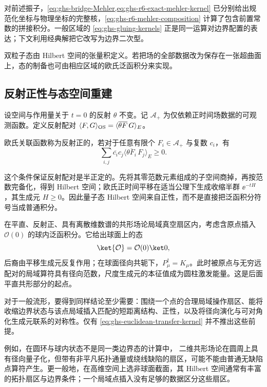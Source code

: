 对前述振子，\cref{eq:ghs-bridge-Mehler,eq:ghs-r6-exact-mehler-kernel} 已分别给出规范化坐标与物理坐标的完整核，\cref{eq:ghs-r6-mehler-composition} 计算了包含前置常数的拼接积分。一般区域的 \cref{eq:ghs-gluing-kernels} 正是同一运算对边界配置的表达；下文利用经典解把它改写为边界二次型。

双粒子态由 Hilbert 空间的张量积定义。若把场的全部数据改为保存在一张超曲面上，态的制备也可由相应区域的欧氏泛函积分来实现。




\subsection{反射正性与态空间重建}

设空间与作用量关于 $t=0$ 的反射 $\theta$ 不变。记 $\mathscr A_+$ 为仅依赖正时间场数据的可观测函数。定义反射配对
$\langle F,G\rangle_{\rm OS}=\langle\overline{\theta F}\,G\rangle_E$。

\begin{definition}[反射正性]
欧氏关联函数称为反射正的，若对于任意有限个 $F_i\in\mathscr A_+$ 与复数 $c_i$，有
\begin{equation}\label{eq:ghs-os-reflection-positivity}
 \sum_{i,j}\overline{c_i}c_j
 \langle\overline{\theta F_i}\,F_j\rangle_E\geq0.
\end{equation}
\end{definition}

这个条件保证反射配对是半正定的。先将其零范数元素组成的子空间商掉，再按范数完备化，得到 Hilbert 空间；欧氏正时间平移在适当公理下生成收缩半群 $\ee^{-tH}$，其生成元 $H\geq0$。因此量子态 Hilbert 空间来自正性，而不是直接把泛函积分符号当成普通积分。


在平直、反射正、具有离散维数谱的共形场论局域真空扇区内，考虑含原点插入 $\mathcal O(0)$ 的球内泛函积分。它给出球面上的态
\[
 \ket{\mathcal O}=\mathcal O(0)\ket0,
\]
后裔由平移生成元反复作用；在球面径向共轭下，$P_\mu^\dagger=K_\mu$。此时被原点与无穷远配对的局域算符具有径向范数，尺度生成元的本征值成为圆柱激发能量。这是后面平直共形部分的起点。

对于一般流形，要得到同样结论至少需要：围绕一个点的合理局域操作扇区、能将收缩边界状态与该点局域插入匹配的短距离结构、正性，以及将径向演化与可对角化生成元联系的对称性。仅有 \cref{eq:ghs-euclidean-transfer-kernel} 并不推出这些前提。



例如，在圆环与球内状态不是同一类边界态的计算中，
二维共形场论在圆周上具有径向量子化，但带有非平凡拓扑通量或绕线缺陷的扇区，可能不能由普通无缺陷点算符产生。更一般地，在高维空间上选非球面截面，其 Hilbert 空间通常有丰富的拓扑扇区与边界条件；一个局域点插入没有足够的数据区分这些扇区。




